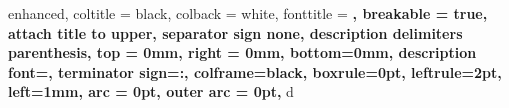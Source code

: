 {
    enhanced,
    coltitle = black,
    colback = white,
    fonttitle = \bfseries,
    breakable = true,
    attach title to upper,
    separator sign none,
    description delimiters parenthesis,
    top = 0mm,
    right = 0mm,
    bottom=0mm,
    description font=\bfseries,
    terminator sign={:\hspace{2mm}},
    colframe=black,
    boxrule=0pt,
    leftrule=2pt,
    left=1mm,
    arc = 0pt,
    outer arc = 0pt,
}
{d}
